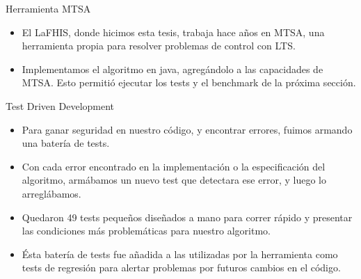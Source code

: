 \begin{frame}{Herramienta MTSA}
    \begin{itemize}
    	\item El LaFHIS, donde hicimos esta tesis, trabaja hace años en MTSA, una herramienta propia para resolver problemas de control con LTS.
    	\item Implementamos el algoritmo en java, agregándolo a las capacidades de MTSA. Esto permitió ejecutar los tests y el benchmark de la próxima sección.
    \end{itemize}
\end{frame}
\begin{frame}{Test Driven Development}
	\begin{itemize}
		\item Para ganar seguridad en nuestro código, y encontrar errores, fuimos armando una batería de tests.
		\item Con cada error encontrado en la implementación o la especificación del algoritmo, armábamos un nuevo test que detectara ese error, y luego lo arreglábamos.
		\item Quedaron 49 tests pequeños diseñados a mano para correr rápido y presentar las condiciones más problemáticas para nuestro algoritmo.
		\item Ésta batería de tests fue añadida a las utilizadas por la herramienta como tests de regresión para alertar problemas por futuros cambios en el código.
	\end{itemize}
\end{frame}
